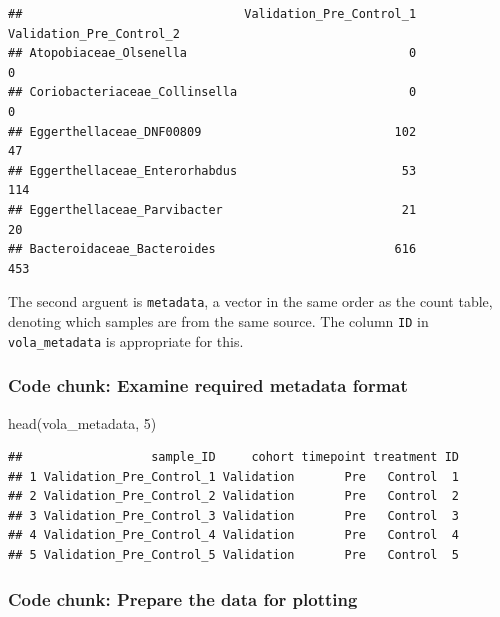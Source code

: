 \documentclass[
]{article}
\newenvironment{Shaded}{\begin{snugshade}}{\end{snugshade}}
\newcommand{\DecValTok}[1]{\textcolor[rgb]{0.00,0.00,0.81}{#1}}
\newcommand{\FunctionTok}[1]{\textcolor[rgb]{0.00,0.00,0.00}{#1}}
\newcommand{\NormalTok}[1]{#1}
\begin{document}
\begin{verbatim}
##                               Validation_Pre_Control_1 Validation_Pre_Control_2
## Atopobiaceae_Olsenella                               0                        0
## Coriobacteriaceae_Collinsella                        0                        0
## Eggerthellaceae_DNF00809                           102                       47
## Eggerthellaceae_Enterorhabdus                       53                      114
## Eggerthellaceae_Parvibacter                         21                       20
## Bacteroidaceae_Bacteroides                         616                      453
\end{verbatim}

The second arguent is \texttt{metadata}, a vector in the same order as
the count table, denoting which samples are from the same source. The
column \texttt{ID} in \texttt{vola\_metadata} is appropriate for this.

\hypertarget{code-chunk-examine-required-metadata-format}{%
\subsubsection{Code chunk: Examine required metadata
format}\label{code-chunk-examine-required-metadata-format}}

\begin{Shaded}
\begin{Highlighting}[]
\FunctionTok{head}\NormalTok{(vola\_metadata, }\DecValTok{5}\NormalTok{)}
\end{Highlighting}
\end{Shaded}

\begin{verbatim}
##                  sample_ID     cohort timepoint treatment ID
## 1 Validation_Pre_Control_1 Validation       Pre   Control  1
## 2 Validation_Pre_Control_2 Validation       Pre   Control  2
## 3 Validation_Pre_Control_3 Validation       Pre   Control  3
## 4 Validation_Pre_Control_4 Validation       Pre   Control  4
## 5 Validation_Pre_Control_5 Validation       Pre   Control  5
\end{verbatim}

\hypertarget{code-chunk-prepare-the-data-for-plotting}{%
\subsubsection{Code chunk: Prepare the data for
plotting}\label{code-chunk-prepare-the-data-for-plotting}}
\end{document}
